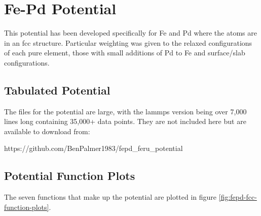 \chapter{Fe-Pd Potential}
\label{chapter:appendix-fepdpotential}

This potential has been developed specifically for Fe and Pd where the atoms are in an \acrshort{fcc} structure.  Particular weighting was given to the relaxed configurations of each pure element, those with small additions of Pd to Fe and surface/slab configurations.

\section{Tabulated Potential}

The files for the potential are large, with the \acrshort{lammps} version being over 7,000 lines long containing 35,000+ data points.  They are not included here but are available to download from:

https://github.com/BenPalmer1983/fepd\_feru\_potential



\clearpage
\FloatBarrier
\section{Potential Function Plots}

The seven functions that make up the potential are plotted in figure \ref{fig:fepd-fcc-function-plots}.

